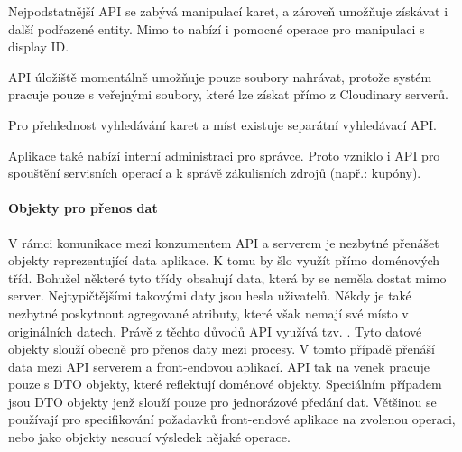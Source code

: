 
			Nejpodstatnější \ac{API} se zabývá manipulací karet, a zároveň umožňuje získávat i další podřazené entity.
			Mimo to nabízí i pomocné operace pro manipulaci s display ID.


			\ac{API} úložiště momentálně umožňuje pouze soubory nahrávat, protože systém pracuje pouze s veřejnými soubory, které
			lze získat přímo z Cloudinary serverů.


			Pro přehlednost vyhledávání karet a míst existuje separátní vyhledávací \ac{API}.


			Aplikace také nabízí interní administraci pro správce.
			Proto vzniklo i \ac{API} pro spouštění servisních operací a k správě zákulisních zdrojů (např.: kupóny).


			\paragraph{Objekty pro přenos dat}

			V rámci komunikace mezi konzumentem \ac{API} a serverem je nezbytné přenášet objekty reprezentující data
			aplikace.
			K tomu by šlo využít přímo doménových tříd.
			Bohužel některé tyto třídy obsahují data, která by se neměla dostat mimo server.
			Nejtypičtějšími takovými daty jsou hesla uživatelů.
			Někdy je také nezbytné poskytnout agregované atributy, které však nemají své místo v originálních datech.
			Právě z těchto důvodů \ac{API} využívá tzv. .
			Tyto datové objekty slouží obecně pro přenos daty mezi procesy.
			V tomto případě přenáší data mezi \ac{API} serverem a front-endovou aplikací.
			\ac{API} tak na venek pracuje pouze s \ac{DTO} objekty, které reflektují doménové objekty.
			Speciálním případem jsou \ac{DTO} objekty jenž slouží pouze pro jednorázové předání dat.
			Většinou se používají pro specifikování požadavků front-endové aplikace na zvolenou operaci, nebo jako
			objekty nesoucí výsledek nějaké operace.

